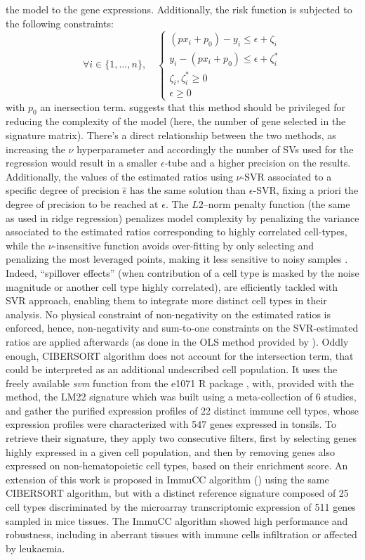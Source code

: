 the model to the gene expressions. Additionally, the risk function is
subjected to the following constraints: \[
\forall i \in \{1, \ldots, n\}, \quad
\begin{cases}
(p x_i + p_0) - y_i \le \epsilon + \zeta_i \\
y_i - (p x_i + p_0)  \le \epsilon + \zeta_i^* \\
\zeta_i, \zeta_i^* \ge 0 \\
\epsilon \ge 0
\end{cases}
\] with \(p_0\) an inersection term. \autocite{cc_cj02} suggests that this method should be privileged for
reducing the complexity of the model (here, the number of gene selected
in the signature matrix). There's a direct relationship between the two
methods, as increasing the \(\nu\) hyperparameter and accordingly the
number of SVs used for the regression would result in a smaller
\(\epsilon\)-tube and a higher precision on the results. Additionally,
the values of the estimated ratios using \(\nu\)-SVR associated to a
specific degree of precision \(\hat{\epsilon}\) has the same solution
than \(\epsilon\)-SVR, fixing a priori the degree of precision to be
reached at \(\epsilon\). The \(L2\)--norm penalty function (the same as
used in ridge regression) penalizes model complexity by penalizing the
variance associated to the estimated ratios corresponding to highly
correlated cell-types, while the \(\nu\)-insensitive function avoids
over-fitting by only selecting and penalizing the most leveraged points,
making it less sensitive to noisy samples
\autocite{cherkassky_ma04}.
Indeed, ``spillover effects'' (when contribution of a cell type is
masked by the noise magnitude or another cell type highly correlated),
are efficiently tackled with SVR approach, enabling them to integrate
more distinct cell types in their analysis. No physical constraint of
non-negativity on the estimated ratios is enforced, hence,
non-negativity and sum-to-one constraints on the SVR-estimated ratios
are applied afterwards (as done in the OLS method provided by
\autocite{abbas_etal09}).
Oddly enough, CIBERSORT algorithm does not account for the intersection
term, that could be interpreted as an additional undescribed cell
population. It uses the freely available \emph{svm} function from the
e1071 R package \autocite{meyer_etal21}, with, provided with the method, the LM22 signature which was
built using a meta-collection of 6 studies, and gather the purified
expression profiles of 22 distinct immune cell types, whose expression
profiles were characterized with 547 genes expressed in tonsils. To
retrieve their signature, they apply two consecutive filters, first by
selecting genes highly expressed in a given cell population, and then by
removing genes also expressed on non-hematopoietic cell types, based on
their enrichment score. An extension of
this work is proposed in ImmuCC algorithm
(\autocite{chen_etal17}) using the
same CIBERSORT algorithm, but with a distinct reference signature
composed of 25 cell types discriminated by the microarray transcriptomic
expression of 511 genes sampled in mice tissues. The ImmuCC algorithm
showed high performance and robustness, including in aberrant tissues
with immune cells infiltration or affected by leukaemia.

